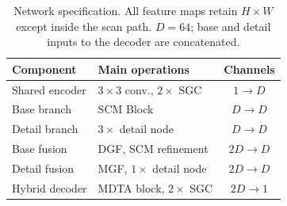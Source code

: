 \begin{table}[!t]
\centering
\caption{Network specification. All feature maps retain $H\times W$ except inside the scan path. $D=64$; base and detail inputs to the decoder are concatenated.}
\label{tab:tensor_dimensions}
\small
\setlength{\tabcolsep}{3pt}
\begin{tabular}{@{}llc@{}}
\toprule
Component & Main operations & Channels\\
\midrule
Shared encoder & $3\times3$ conv., $2\times$ SGC & $1\to D$\\
Base branch & SCM Block & $D\to D$\\
Detail branch & $3\times$ detail node & $D\to D$\\
Base fusion & DGF, SCM refinement & $2D\to D$\\
Detail fusion & MGF, $1\times$ detail node & $2D\to D$\\
Hybrid decoder & MDTA block, $2\times$ SGC & $2D\to1$\\
\bottomrule
\end{tabular}
\end{table}
